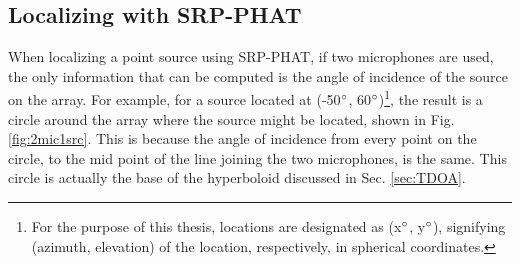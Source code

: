 \subsection{Localizing with SRP-PHAT}
When localizing a point source using SRP-PHAT, if two microphones are used, the only information that can be computed is the angle of incidence of the source on the array. For example, for a source located at (-50$\degree$, 60$\degree$)\footnote{For the purpose of this thesis, locations are designated as (x$\degree$, y$\degree$), signifying (azimuth, elevation) of the location, respectively, in spherical coordinates.}, the result is a circle around the array where the source might be located, shown in Fig. \ref{fig:2mic1src}. This is because the angle of incidence from every point on the circle, to the mid point of the line joining the two microphones, is the same. This circle is actually the base of the hyperboloid discussed in Sec. \ref{sec:TDOA}.

